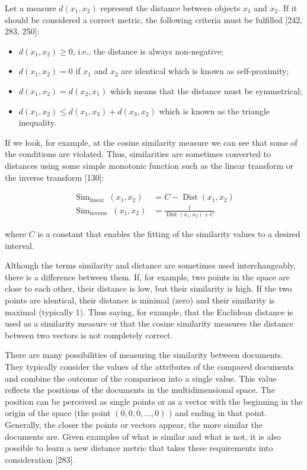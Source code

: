 \documentclass[10pt]{book}
\begin{document}
Let a measure $d\left(x_{1}, x_{2}\right)$ represent the distance between objects $x_{1}$ and $x_{2}$. If it should be considered a correct metric, the following criteria must be fulfilled [242, 283, 250]:

\begin{itemize}
  \item $d\left(x_{1}, x_{2}\right) \geq 0$, i.e., the distance is always non-negative;
  \item $d\left(x_{1}, x_{2}\right)=0$ if $x_{1}$ and $x_{2}$ are identical which is known as self-proximity;
  \item $d\left(x_{1}, x_{2}\right)=d\left(x_{2}, x_{1}\right)$ which means that the distance must be symmetrical;
  \item $d\left(x_{1}, x_{2}\right) \leq d\left(x_{1}, x_{3}\right)+d\left(x_{3}, x_{2}\right)$ which is known as the triangle inequality.
\end{itemize}

If we look, for example, at the cosine similarity measure we can see that some of the conditions are violated. Thus, similarities are sometimes converted to distances using some simple monotonic function such as the linear transform or the inverse transform [130]:


\begin{align*}
\operatorname{Sim}_{\text {linear }}\left(x_{1}, x_{2}\right) & =C-\operatorname{Dist}\left(x_{1}, x_{2}\right)  \tag{12.2}\\
\operatorname{Sim}_{\text {inverse }}\left(x_{1}, x_{2}\right) & =\frac{1}{\operatorname{Dist}\left(x_{1}, x_{2}\right)+C} \tag{12.3}
\end{align*}


where $C$ is a constant that enables the fitting of the similarity values to a desired interval.

Although the terms similarity and distance are sometimes used interchangeably, there is a difference between them. If, for example, two points in the space are close to each other, their distance is low, but their similarity is high. If the two points are identical, their distance is minimal (zero) and their similarity is maximal (typically 1). Thus saying, for example, that the Euclidean distance is used as a similarity measure or that the cosine similarity measures the distance between two vectors is not completely correct.

There are many possibilities of measuring the similarity between documents. They typically consider the values of the attributes of the compared documents and combine the outcome of the comparison into a single value. This value reflects the positions of the documents in the multidimensional space. The position can be perceived as single points or as a vector with the beginning in the origin of the space (the point $(0,0,0, \ldots, 0)$ ) and ending in that point. Generally, the closer the points or vectors appear, the more similar the documents are. Given examples of what is similar and what is not, it is also possible to learn a new distance metric that takes these requirements into consideration [283].
\end{document}
